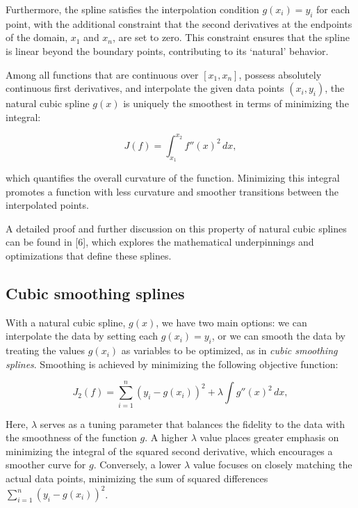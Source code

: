\documentclass[
11pt, %
oneside, %
english, %
singlespacing, %
]{macthesis} %
\begin{document}
Furthermore, the spline satisfies the interpolation condition \(g(x_i) = y_i\) for each point, with the additional constraint that the second derivatives at the endpoints of the domain, \(x_1\) and \(x_n\), are set to zero. This constraint ensures that the spline is linear beyond the boundary points, contributing to its `natural' behavior.

Among all functions that are continuous over \([x_1, x_n]\), possess absolutely continuous first derivatives, and interpolate the given data points \((x_i, y_i)\), the natural cubic spline \(g(x)\) is uniquely the smoothest in terms of minimizing the integral:

\begin{equation}
J(f) = \int_{x_{1}}^{x_{2}} f''(x)^{2}\,dx,
\label{eq:min_smoothness}
\end{equation}

which quantifies the overall curvature of the function. Minimizing this integral promotes a function with less curvature and smoother transitions between the interpolated points.

A detailed proof and further discussion on this property of natural cubic splines can be found in {[}6{]}, which explores the mathematical underpinnings and optimizations that define these splines.

\subsection{Cubic smoothing splines}\label{Cubic-smoothing-splines}

With a natural cubic spline, \(g(x)\), we have two main options: we can interpolate the data by setting each \(g(x_i) = y_i\), or we can smooth the data by treating the values \(g(x_i)\) as variables to be optimized, as in \emph{cubic smoothing splines}. Smoothing is achieved by minimizing the following objective function:

\begin{equation}
J_{2}(f) = \sum_{i=1}^n (y_i - g(x_i))^2 + \lambda \int g''(x)^2 \, dx,
\label{eq:min_smoothness_obj}
\end{equation}

Here, \(\lambda\) serves as a tuning parameter that balances the fidelity to the data with the smoothness of the function \(g\). A higher \(\lambda\) value places greater emphasis on minimizing the integral of the squared second derivative, which encourages a smoother curve for \(g\). Conversely, a lower \(\lambda\) value focuses on closely matching the actual data points, minimizing the sum of squared differences \(\sum_{i=1}^n (y_i - g(x_i))^2\).
\end{document}
